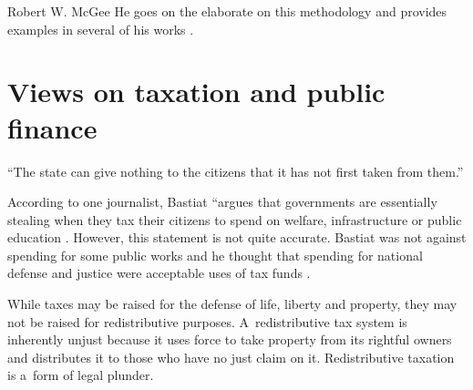 \begin{artengenv}{Robert W. McGee}
He goes on the elaborate on this methodology and provides examples in several of his works 
\parencites[][]{bastiat_ce_1850}[][]{bastiat_harmonies_1870}[][]{bastiat_ce_1873}[][]{bastiat_sophismes_1873}[][]{bastiat_economic_1964}[][]{bastiat_economic_1964-1}[][]{bastiat_selected_1964}[][]{bastiat_bastiat_2007}.%




\section{Views on taxation and public finance}

\begin{flushright}
``The state can give nothing to the citizens that it has not first taken from them.'' 
\parencite[][p.183]{bastiat_selected_1964}%
\end{flushright}




According to one journalist, Bastiat ``argues that governments are essentially stealing when they tax their citizens to spend on welfare, infrastructure or public education 
\parencite[][]{zernike_shaping_2010}. %
 However, this statement is not quite accurate. Bastiat was not against spending for some public works 
\parencite[][p.46]{bastiat_economic_1964} %
 and he thought that spending for national defense and justice were acceptable uses of tax funds 
\parencite[][p.184]{bastiat_selected_1964}.%




While taxes may be raised for the defense of life, liberty and property, they may not be raised for redistributive purposes. A~redistributive tax system is inherently unjust because it uses force to take property from its rightful owners and distributes it to those who have no just claim on it. Redistributive taxation is a~form of legal plunder.




\end{artengenv}
